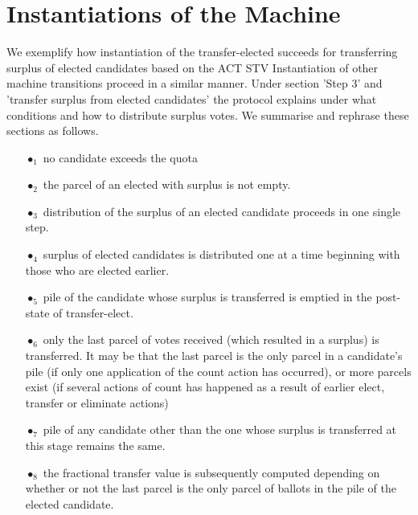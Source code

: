 \documentclass[10pt,conference]{IEEEtran}
\begin{document}
\section{Instantiations of the Machine}\label{sec:InstMachine}
We exemplify how instantiation of the transfer-elected succeeds for transferring surplus of elected candidates based on the ACT STV
Instantiation of other machine transitions proceed in a  similar manner.    
Under section 'Step 3' and 'transfer surplus from elected candidates' the protocol explains under what conditions and how to distribute surplus votes. We summarise and rephrase these sections as follows. 
\begin{itemize}
\item[$\bullet_{1}$] no  candidate exceeds the quota
\item[$\bullet_{2}$] the  parcel of an elected with surplus is not empty.
\item[$\bullet_{3}$] distribution of the surplus of an elected candidate proceeds in one single step.
\item[$\bullet_{4}$] surplus of elected candidates is distributed one at a time beginning with those who are elected earlier. 
\item[$\bullet_{5}$] pile of the candidate whose surplus is transferred is emptied in the post-state of transfer-elect.
\item[$\bullet_{6}$] only the last parcel of votes  received (which resulted in a surplus) is transferred. It may be that the last parcel is the only parcel in a candidate's pile (if only one application of the count action has occurred), or more parcels exist (if several actions of count has happened as a result of earlier  elect, transfer or eliminate actions)
\item[$\bullet_{7}$] pile of any candidate other than the one whose surplus is transferred at this stage remains the same.
\item[$\bullet_{8}$] the fractional transfer value is subsequently computed depending on whether or not the last parcel is the only parcel of ballots in the pile of the elected candidate. 
\end{itemize}
\end{document}
